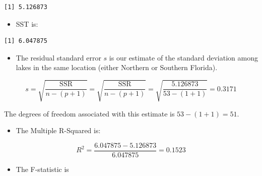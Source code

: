 \documentclass[
  letterpaper,
  DIV=11,
  numbers=noendperiod]{scrreprt}
\newenvironment{Shaded}{\begin{snugshade}}{\end{snugshade}}
\newcommand{\DecValTok}[1]{\textcolor[rgb]{0.68,0.00,0.00}{#1}}
\newcommand{\FunctionTok}[1]{\textcolor[rgb]{0.28,0.35,0.67}{#1}}
\newcommand{\NormalTok}[1]{\textcolor[rgb]{0.00,0.23,0.31}{#1}}
\newcommand{\SpecialCharTok}[1]{\textcolor[rgb]{0.37,0.37,0.37}{#1}}
\providecommand{\tightlist}{%
  \setlength{\itemsep}{0pt}\setlength{\parskip}{0pt}}\usepackage{longtable,booktabs,array}
\begin{document}
\begin{Shaded}
\end{Shaded}

\begin{verbatim}
[1] 5.126873
\end{verbatim}

\begin{itemize}
\tightlist
\item
  SST is:
\end{itemize}

\begin{Shaded}
\end{Shaded}

\begin{verbatim}
[1] 6.047875
\end{verbatim}

\begin{itemize}
\tightlist
\item
  The residual standard error \(s\) is our estimate of the standard
  deviation among lakes in the same location (either Northern or
  Southern Florida).
\end{itemize}

\[ s =\sqrt{\frac{\text{SSR}}{n-(p+1)}} = \sqrt{\frac{\text{SSR}}{n-(p+1)}} = \sqrt{\frac{5.126873}{53-(1+1)}}=0.3171 \]

The degrees of freedom associated with this estimate is
\(53-(1+1) = 51\).

\begin{itemize}
\tightlist
\item
  The Multiple R-Squared is:
\end{itemize}

\[ R^2 = \frac{6.047875 - 5.126873}{6.047875} = 0.1523 \]

\begin{itemize}
\tightlist
\item
  The F-statistic is
\end{itemize}
\end{document}
